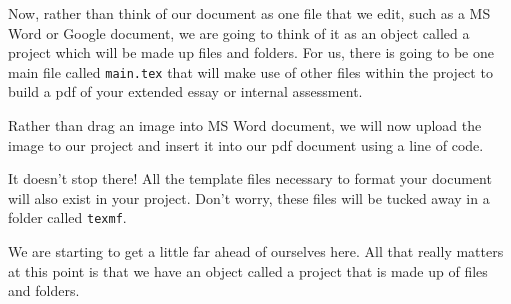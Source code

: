Now, rather than think of our document as one file that we edit, such as a
MS Word or Google document, we are going to think of it as an object called a
project which will be made up files and folders. For us, there is going to be
one main file called \texttt{main.tex} that will make use of other files
within the project to build a pdf of your extended essay or internal assessment.

\begin{example}
  Rather than drag an image into MS Word document, we will now
  upload the image to our project and insert it into our pdf document using
  a line of code.
\end{example}

It doesn't stop there!  All the template files necessary to format your document
will also exist in your project.  Don't worry, these files will be tucked away
in a folder called \texttt{texmf}.

We are starting to get a little far ahead of ourselves here.  All that really
matters at this point is that we have an object called a project that is made up
of files and folders.

